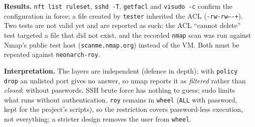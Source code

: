 \documentclass[10.5pt,a4paper]{article}
\newcommand{\cmd}[1]{\texttt{#1}}
\begin{document}
\textbf{Results.} \cmd{nft list ruleset}, \cmd{sshd -T}, \cmd{getfacl} and \cmd{visudo -c} confirm the configuration in force; a file created by \cmd{tester} inherited the ACL (\cmd{-rw-rw----+}). Two tests are not valid yet and are reported as such: the ACL ``cannot delete'' test targeted a file that did not exist, and the recorded \cmd{nmap} scan was run against Nmap's public test host (\cmd{scanme.nmap.org}) instead of the VM. Both must be repeated against \cmd{neonarch-roy}.

\textbf{Interpretation.} The layers are independent (defence in depth): with \cmd{policy drop} an unlisted port gives no answer, so nmap reports it as \emph{filtered} rather than \emph{closed}; without passwords, SSH brute force has nothing to guess; sudo limits what runs without authentication. \cmd{roy} remains in \cmd{wheel} (\cmd{ALL} with password, kept for the project's scripts), so the restriction covers password-less execution, not everything; a stricter design removes the user from \cmd{wheel}.

\end{document}
